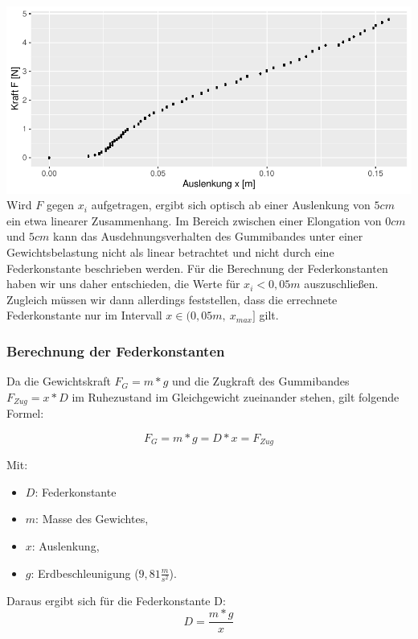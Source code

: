 \documentclass[
  9pt,
]{article}
\providecommand{\tightlist}{%
  \setlength{\itemsep}{0pt}\setlength{\parskip}{0pt}}
\begin{document}
\includegraphics{DehnbareStoffe_files/figure-latex/unnamed-chunk-6-1.pdf}
Wird \(F\) gegen \(x_i\) aufgetragen, ergibt sich optisch ab einer
Auslenkung von \(5cm\) ein etwa linearer Zusammenhang. Im Bereich
zwischen einer Elongation von \(0cm\) und \(5cm\) kann das
Ausdehnungsverhalten des Gummibandes unter einer Gewichtsbelastung nicht
als linear betrachtet und nicht durch eine Federkonstante beschrieben
werden. Für die Berechnung der Federkonstanten haben wir uns daher
entschieden, die Werte für \(x_i<0,05m\) auszuschließen. Zugleich müssen
wir dann allerdings feststellen, dass die errechnete Federkonstante nur
im Intervall \(x \in (0,05m,\ x_{max}]\) gilt.

\hypertarget{berechnung-der-federkonstanten}{%
\subsubsection{Berechnung der
Federkonstanten}\label{berechnung-der-federkonstanten}}

Da die Gewichtskraft \(F_G=m*g\) und die Zugkraft des Gummibandes
\(F_{Zug} = x * D\) im Ruhezustand im Gleichgewicht zueinander stehen,
gilt folgende Formel:

\[F_G = m * g = D*x = F_{Zug}\]

Mit:

\begin{itemize}
\tightlist
\item
  \(D\): Federkonstante
\item
  \(m\): Masse des Gewichtes,
\item
  \(x\): Auslenkung,
\item
  \(g\): Erdbeschleunigung (\(9,81\frac{m}{s^2}\)).
\end{itemize}

Daraus ergibt sich für die Federkonstante D:
\begin{equation}\label{hook:eq:Federkonstante}
  D =\frac{m*g}{x}
\end{equation}
\end{document}
